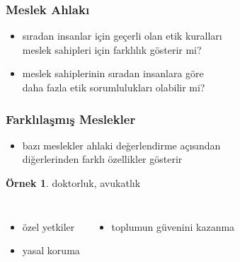 \documentclass[dvipsnames]{beamer}
\theoremstyle{definition}
\theoremstyle{example}
\newtheorem{ornek}[theorem]{Örnek}
\theoremstyle{plain}
\begin{document}
\begin{frame}
  \frametitle{Meslek Ahlakı}

  \begin{itemize}
    \item sıradan insanlar için geçerli olan etik kuralları\\
      meslek sahipleri için farklılık gösterir mi?

    \item meslek sahiplerinin sıradan insanlara göre\\
      daha fazla etik sorumlulukları olabilir mi?
  \end{itemize}
\end{frame}

\begin{frame}
  \frametitle{Farklılaşmış Meslekler}

  \begin{itemize}
    \item bazı meslekler ahlaki değerlendirme açısından\\
      diğerlerinden farklı özellikler gösterir
  \end{itemize}

  \begin{ornek}
    doktorluk, avukatlık
  \end{ornek}

  \pause
  \begin{columns}
    \begin{itemize}
      \item özel yetkiler
      \item yasal koruma
    \end{itemize}

    \begin{itemize}
      \item toplumun güvenini kazanma
    \end{itemize}
  \end{columns}
\end{frame}
\end{document}
